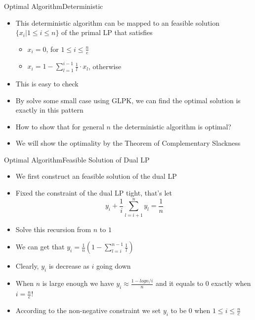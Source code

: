 \documentclass{beamer}
\begin{document}
\begin{frame}{Optimal Algorithm}{Deterministic}
	\begin{itemize}
		\item This deterministic algorithm can be mapped to an feasible solution $\{x_i|1\leq i\leq n\}$ of the primal LP that satisfies
			\begin{itemize}
					\item $x_i = 0$, for $1\leq i\leq \frac{n}{e}$
					\item $x_i = 1-\sum_{l = 1}^{i-1}\frac{1}{l}\cdot x_l$, otherwise
			\end{itemize}
		\item This is easy to check
		\item By solve some small case using GLPK, we can find the optimal solution is exactly in this pattern
		\item How to show that for general $n$ the deterministic algorithm is optimal?
		\item We will show the optimality by the Theorem of Complementary Slackness
	\end{itemize}
\end{frame}
\begin{frame}{Optimal Algorithm}{Feasible Solution of Dual LP}
	\begin{itemize}	
		\item We first construct an feasible solution of the dual LP
		\item Fixed the constraint of the dual LP tight, that's let 
				$$y_i +\frac{1}{i}\sum_{l = i+1}^{n} y_l = \frac{1}{n}$$
		\item Solve this recursion from $n$ to $1$
		\item We can get that $y_i=\frac{1}{n}\left(1-\sum_{l = i}^{n-1}\frac{1}{l}\right)$
		\item Clearly, $y_i$ is decrease as $i$ going down
		\item When $n$ is large enough we have $y_i \approx \frac{1-log n/i}{n}$ and it equals to 0 exactly when $i = \frac{n}{e}$!
		\item According to the non-negative constraint we set $y_i$ to be 0 when $1\leq i \leq \frac{n}{e}$
	\end{itemize}
\end{frame}
\end{document}
